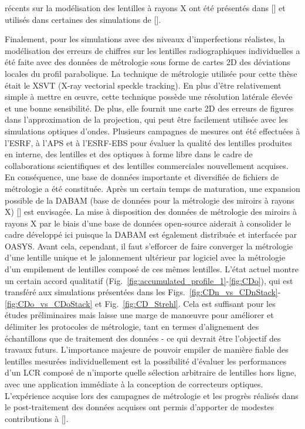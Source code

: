 \begin{refsection}
récents sur la modélisation des lentilles à rayons X ont été présentés dans [\cite{Celestre2020b}] et utilisés dans certaines des simulations de [\cite{Chubar2020}].

Finalement, pour les simulations avec des niveaux d'imperfections réalistes, la modélisation des erreurs de chiffres sur les lentilles radiographiques individuelles a été faite avec des données de métrologie sous forme de cartes 2D des déviations locales du profil parabolique. La technique de métrologie utilisée pour cette thèse était le XSVT (X-ray vectorial speckle tracking). En plus d'être relativement simple à mettre en œuvre, cette technique possède une résolution latérale élevée et une bonne sensibilité. De plus, elle fournit une carte 2D des erreurs de figures dans l'approximation de la projection, qui peut être facilement utilisée avec les simulations optiques d'ondes. 
Plusieurs campagnes de mesures ont été effectuées à l'ESRF, à l'APS et à l'ESRF-EBS pour évaluer la qualité des lentilles produites en interne, des lentilles et des optiques à forme libre dans le cadre de collaborations scientifiques et des lentilles commerciales nouvellement acquises. En conséquence, une base de données importante et diversifiée de fichiers de métrologie a été constituée. Après un certain temps de maturation, une expansion possible de la DABAM (base de données pour la métrologie des miroirs à rayons X) [\cite{SanchezDelRio2016}] est envisagée. La mise à disposition des données de métrologie des miroirs à rayons X par le biais d'une base de données open-source aiderait à consolider le cadre développé ici puisque la DABAM est également distribuée et interfacée par OASYS. Avant cela, cependant, il faut s'efforcer de faire converger la métrologie d'une lentille unique et le jalonnement ultérieur par logiciel avec la métrologie d'un empilement de lentilles composé de ces mêmes lentilles. L'état actuel montre un certain accord qualitatif (Fig.~\ref{fig:accumulated_profile_1}-\ref{fig:CDo}), qui est transféré aux simulations présentées dans les Figs.~\ref{fig:CDn_vs_CDnStack}-\ref{fig:CDo_vs_CDoStack} et Fig.~\ref{fig:CD_Strehl}. Cela est suffisant pour les études préliminaires mais laisse une marge de manœuvre pour améliorer et délimiter les protocoles de métrologie, tant en termes d'alignement des échantillons que de traitement des données - ce qui devrait être l'objectif des travaux futurs. L'importance majeure de pouvoir empiler de manière fiable des lentilles mesurées individuellement est la possibilité d'évaluer les performances d'un LCR composé de n'importe quelle sélection arbitraire de lentilles hors ligne, avec une application immédiate à la conception de correcteurs optiques. L'expérience acquise lors des campagnes de métrologie et les progrès réalisés dans le post-traitement des données acquises ont permis d'apporter de modestes contributions à [\cite{Berujon2020a,Berujon2020,Qiao2020b}].


\end{refsection}
